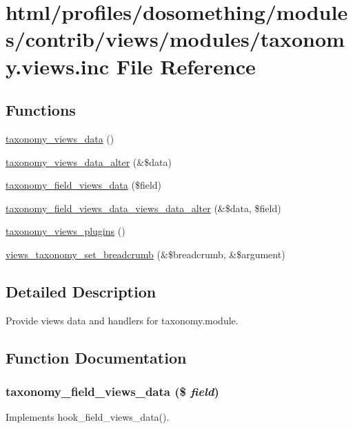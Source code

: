 \hypertarget{taxonomy_8views_8inc}{
\section{html/profiles/dosomething/modules/contrib/views/modules/taxonomy.views.inc File Reference}
\label{taxonomy_8views_8inc}
}
\subsection*{Functions}
\begin{DoxyCompactItemize}
\item 
\hyperlink{taxonomy_8views_8inc_a7d924f539ca1e7da381929bec742e8fd}{taxonomy\_\-views\_\-data} ()
\item 
\hyperlink{taxonomy_8views_8inc_aa6aab8471715a703a640f25f9cfe8efb}{taxonomy\_\-views\_\-data\_\-alter} (\&\$data)
\item 
\hyperlink{taxonomy_8views_8inc_a7f2e2d6594659210bd8a72f80efd88e6}{taxonomy\_\-field\_\-views\_\-data} (\$field)
\item 
\hyperlink{taxonomy_8views_8inc_a3bc51da9827bc04f4afe696788e313bd}{taxonomy\_\-field\_\-views\_\-data\_\-views\_\-data\_\-alter} (\&\$data, \$field)
\item 
\hyperlink{taxonomy_8views_8inc_adf4c4ae0f65e3a97003ca804bfff4c9c}{taxonomy\_\-views\_\-plugins} ()
\item 
\hyperlink{taxonomy_8views_8inc_ae3ea861745bda984b3d544ac856012e0}{views\_\-taxonomy\_\-set\_\-breadcrumb} (\&\$breadcrumb, \&\$argument)
\end{DoxyCompactItemize}


\subsection{Detailed Description}
Provide views data and handlers for taxonomy.module. 

\subsection{Function Documentation}
\hypertarget{taxonomy_8views_8inc_a7f2e2d6594659210bd8a72f80efd88e6}{
\subsubsection[{taxonomy\_\-field\_\-views\_\-data}]{\setlength{\rightskip}{0pt plus 5cm}taxonomy\_\-field\_\-views\_\-data (\$ {\em field})}}
\label{taxonomy_8views_8inc_a7f2e2d6594659210bd8a72f80efd88e6}
Implements hook\_\-field\_\-views\_\-data().

